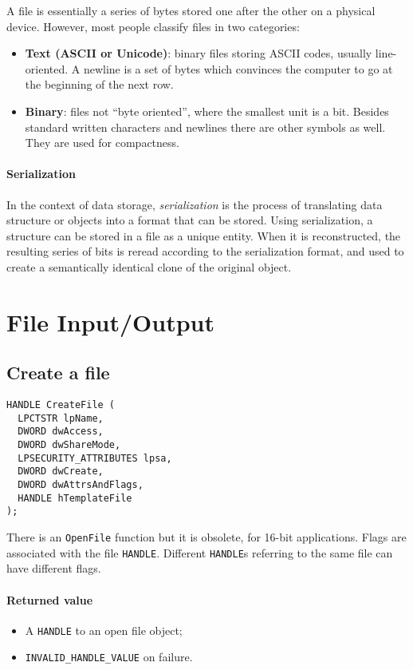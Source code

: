 \bigskip

A file is essentially a series of bytes stored one after the other on a physical device. However, most people classify files in two categories:
\begin{itemize}
\item \textbf{Text (ASCII or Unicode)}: binary files storing ASCII codes, usually line-oriented. A newline is a set of bytes which convinces the computer to go at the beginning of the next row.
\item \textbf{Binary}: files not ``byte oriented'', where the smallest unit is a bit. Besides standard written characters and newlines there are other symbols as well. They are used for compactness.
\end{itemize}

\paragraph{Serialization}
In the context of data storage, \emph{serialization} is the process of translating data structure or objects into a format that can be stored. Using serialization, a structure can be stored in a file as a unique entity. When it is reconstructed, the resulting series of bits is reread according to the serialization format, and used to create a semantically identical clone of the original object.

\section{File Input/Output}
\subsection{Create a file}
\begin{verbatim}
HANDLE CreateFile (
  LPCTSTR lpName,
  DWORD dwAccess,
  DWORD dwShareMode,
  LPSECURITY_ATTRIBUTES lpsa,
  DWORD dwCreate,
  DWORD dwAttrsAndFlags,
  HANDLE hTemplateFile
);
\end{verbatim}

There is an \texttt{OpenFile} function but it is obsolete, for 16-bit applications. Flags are associated with the file \texttt{HANDLE}. Different \texttt{HANDLE}s referring to the same file can have different flags.

\paragraph{Returned value}
\begin{itemize}
\item A \texttt{HANDLE} to an open file object;
\item \texttt{INVALID\_HANDLE\_VALUE} on failure.
\end{itemize}

